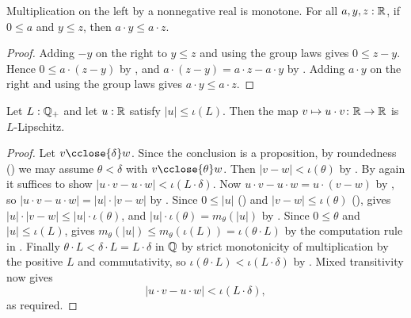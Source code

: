 \begin{lemma}
  \label{mulMonoLLeReal}
  Multiplication on the left by a nonnegative real is monotone. For all $a, y, z : \mathbb{R}$, if $0 \le a$ and $y \le z$, then $a \cdot y \le a \cdot z$.
\end{lemma}
\begin{proof}
  Adding $-y$ on the right to $y \le z$ and using the group laws gives $0 \le z - y$. Hence $0 \le a \cdot (z - y)$ by , and $a \cdot (z - y) = a \cdot z - a \cdot y$ by . Adding $a \cdot y$ on the right and using the group laws gives $a \cdot y \le a \cdot z$.
\end{proof}

\begin{lemma}
  \label{mulIsLipschitzWithL}
  Let $L : \mathbb{Q}_{+}$ and let $u : \mathbb{R}$ satisfy $\lvert u \rvert \le \iota(L)$. Then the map $v \mapsto u \cdot v \colon \mathbb{R} \to \mathbb{R}$ is $L$-Lipschitz.
\end{lemma}
\begin{proof}
  Let $v \cclose{\delta} w$. Since the conclusion is a proposition, by roundedness () we may assume $\theta < \delta$ with $v \cclose{\theta} w$. Then $\lvert v - w \rvert < \iota(\theta)$ by . By  again it suffices to show $\lvert u \cdot v - u \cdot w \rvert < \iota(L \cdot \delta)$. Now $u \cdot v - u \cdot w = u \cdot (v - w)$ by , so $\lvert u \cdot v - u \cdot w \rvert = \lvert u \rvert \cdot \lvert v - w \rvert$ by . Since $0 \le \lvert u \rvert$ () and $\lvert v - w \rvert \le \iota(\theta)$ (),  gives $\lvert u \rvert \cdot \lvert v - w \rvert \le \lvert u \rvert \cdot \iota(\theta)$, and $\lvert u \rvert \cdot \iota(\theta) = m_\theta(\lvert u \rvert)$ by . Since $0 \le \theta$ and $\lvert u \rvert \le \iota(L)$,  gives $m_\theta(\lvert u \rvert) \le m_\theta(\iota(L)) = \iota(\theta \cdot L)$ by the computation rule in . Finally $\theta \cdot L < \delta \cdot L = L \cdot \delta$ in $\mathbb{Q}$ by strict monotonicity of multiplication by the positive $L$ and commutativity, so $\iota(\theta \cdot L) < \iota(L \cdot \delta)$ by . Mixed transitivity now gives
  \[
    \lvert u \cdot v - u \cdot w \rvert < \iota(L \cdot \delta),
  \]
  as required.
\end{proof}

